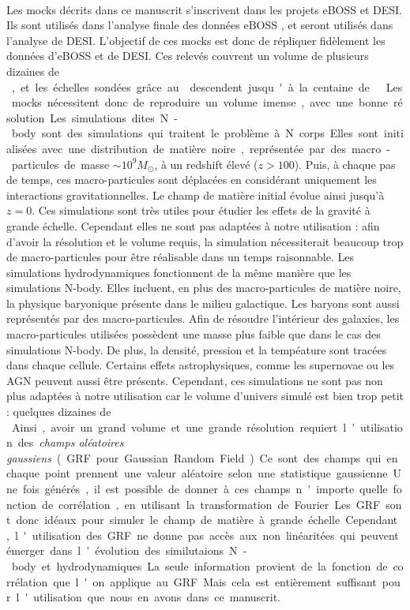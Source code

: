 \documentclass[11pt, twoside, a4paper, openright]{report}
\begin{document}
\paragraph{}
Les mocks décrits dans ce manuscrit s'inscrivent dans les projets eBOSS et DESI. Ils sont utilisés dans l'analyse \lya{} finale des données eBOSS \citep{CITE:dr16}, et seront utilisés dans l'analyse \lya{} de DESI.
L'objectif de ces mocks est donc de répliquer fidèlement les données \lya{} d'eBOSS et de DESI. Ces relevés couvrent un volume de plusieurs dizaines de \si{\perh\cubic\Gpc}, et les échelles sondées grâce au \lya{} descendent jusqu'à la centaine de \si{\perh\kpc}. Les mocks nécessitent donc de reproduire un volume imense, avec une bonne résolution.
Les simulations dites N-body sont des simulations qui traitent le problème à N corps. Elles sont initialisées avec une distribution de matière noire, représentée par des macro-particules de masse $\sim 10^{9} M_{\odot}$, à un redshift élevé ($z > 100$). Puis, à chaque pas de temps, ces macro-particules sont déplacées en considérant uniquement les interactions gravitationnelles. Le champ de matière initial évolue ainsi jusqu'à $z=0$. Ces simulations sont très utiles pour étudier les effets de la gravité à grande échelle. Cependant elles ne sont pas adaptées à notre utilisation : afin d'avoir la résolution et le volume requis, la simulation nécessiterait beaucoup trop de macro-particules pour être réalisable dans un temps raisonnable.
Les simulations hydrodynamiques fonctionnent de la même manière que les simulations N-body. Elles incluent, en plus des macro-particules de matière noire, la physique baryonique présente dans le milieu galactique. Les baryons sont aussi représentés par des macro-particules. Afin de résoudre l'intérieur des galaxies, les macro-particules utilisées possèdent une masse plus faible que dans le cas des simulations N-body. De plus, la densité, pression et la tempéature sont tracées dans chaque cellule. Certains effets astrophysiques, comme les supernovae ou les AGN peuvent aussi être présents. Cependant, ces simulations ne sont pas non plus adaptées à notre utilisation car le volume d'univers simulé est bien trop petit : quelques dizaines de \si{\perh\cubic\Mpc}.
Ainsi, avoir un grand volume et une grande résolution requiert l'utilisation des \emph{champs aléatoires gaussiens} (GRF pour Gaussian Random Field). Ce sont des champs qui en chaque point prennent une valeur aléatoire selon une statistique gaussienne. Une fois générés, il est possible de donner à ces champs n'importe quelle fonction de corrélation, en utilisant la transformation de Fourier. Les GRF sont donc idéaux pour simuler le champ de matière à grande échelle. Cependant, l'utilisation des GRF ne donne pas accès aux non linéaritées qui peuvent émerger dans l'évolution des similutaions N-body et hydrodynamiques. La seule information provient de la fonction de corrélation que l'on applique au GRF. Mais cela est entièrement suffisant pour l'utilisation que nous en avons dans ce manuscrit.
\end{document}
